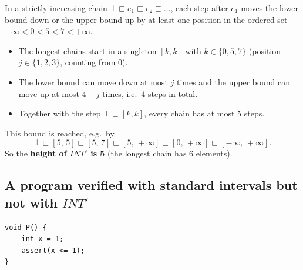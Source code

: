 \documentclass[11pt,a4paper]{article}
\newenvironment{fitbox}
  {\begin{lrbox}{\fitboxcontent}}
  {\end{lrbox}%
   \ifdim\wd\fitboxcontent>\linewidth
     \resizebox{\linewidth}{!}{\usebox{\fitboxcontent}}%
   \else
     \usebox{\fitboxcontent}%
   \fi}
\newcommand{\itv}[2]{[#1,\,#2]}
\newcommand{\ninf}{-\infty}
\newcommand{\pinf}{+\infty}
\newcommand{\INTp}{\mathit{INT}'}
\begin{document}
In a strictly increasing chain $\bot \sqsubset e_1 \sqsubset e_2 \sqsubset \dots$, each step
after $e_1$ moves the lower bound down or the upper bound up by at least one position in the
ordered set $\ninf < 0 < 5 < 7 < \pinf$.
\begin{itemize}
  \item The longest chains start in a singleton $[k,k]$ with $k \in \{0, 5, 7\}$ (position
        $j \in \{1,2,3\}$, counting from $0$).
  \item The lower bound can move down at most $j$ times and the upper bound can move up at
        most $4 - j$ times, i.e.\ 4 steps in total.
  \item Together with the step $\bot \sqsubset [k,k]$, every chain has at most 5 steps.
\end{itemize}
This bound is reached, e.g.\ by
\[
  \bot \sqsubset \itv{5}{5} \sqsubset \itv{5}{7} \sqsubset \itv{5}{\pinf}
       \sqsubset \itv{0}{\pinf} \sqsubset \itv{\ninf}{\pinf}.
\]
So the \textbf{height of $\INTp$ is 5} (the longest chain has 6 elements).

\subsection*{A program verified with standard intervals but not with $\INTp$}

\begin{lstlisting}
void P() {
    int x = 1;
    assert(x <= 1);
}
\end{lstlisting}

\begin{center}
\begin{fitbox}\end{fitbox}
\end{center}
\end{document}
